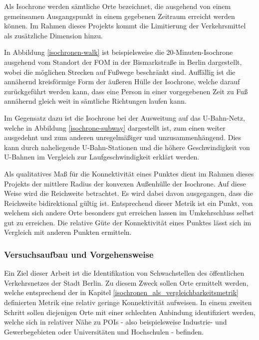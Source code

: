 Als Isochrone werden sämtliche Orte bezeichnet, die ausgehend von einem gemeinsamen Ausgangspunkt in einem gegebenen Zeitraum erreicht werden können. Im Rahmen dieses Projekts kommt die Limitierung der Verkehrsmittel als zusätzliche Dimension hinzu.

In Abbildung \ref{isochronen-walk} ist beispielsweise die 20-Minuten-Isochrone ausgehend vom Standort der FOM in der Bismarkstraße in Berlin dargestellt, wobei die möglichen Strecken auf Fußwege beschränkt sind. Auffällig ist die annähernd kreisförmige Form der äußeren Hülle der Isochrone, welche darauf zurückgeführt werden kann, dass eine Person in einer vorgegebenen Zeit zu Fuß annähernd gleich weit in sämtliche Richtungen laufen kann.


Im Gegensatz dazu ist die Isochrone bei der Ausweitung auf das U-Bahn-Netz, welche in Abbildung \ref{isochrone-subway} dargestellt ist, zum einen weiter ausgedehnt und zum anderen unregelmäßiger und unzusammenhängend. Dies kann durch naheliegende U-Bahn-Stationen und die höhere Geschwindigkeit von U-Bahnen im Vergleich zur Laufgeschwindigkeit erklärt werden.


Als qualitatives Maß für die Konnektivität eines Punktes dient im Rahmen dieses Projekts der mittlere Radius der konvexen Außenhülle der Isochrone. Auf diese Weise wird die Reichweite betrachtet. Es wird dabei davon ausgegangen, dass die Reichweite bidirektional gültig ist. Entsprechend dieser Metrik ist ein Punkt, von welchem sich andere Orte besonders gut erreichen lassen im Umkehrschluss selbst gut zu erreichen. Die relative Güte der Konnektivität eines Punktes lässt sich im Vergleich mit anderen Punkten ermitteln.

\subsubsection{Versuchsaufbau und Vorgehensweise}
\label{versuchsaufbau_und_vorgehensweise}

Ein Ziel dieser Arbeit ist die Identifikation von Schwachstellen des öffentlichen Verkehrsnetzes der Stadt Berlin. Zu diesem Zweck sollen Orte ermittelt werden, welche entsprechend der in Kapitel \ref{isochronen_als_vergleichbarkeitsmetrik} definierten Metrik eine relativ geringe Konnektivität aufweisen. In einem zweiten Schritt sollen diejenigen Orte mit einer schlechten Anbindung identifiziert werden, welche sich in relativer Nähe zu \acp{POI} - also beispielsweise Industrie- und Gewerbegebieten oder Universitäten und Hochschulen -  befinden.

